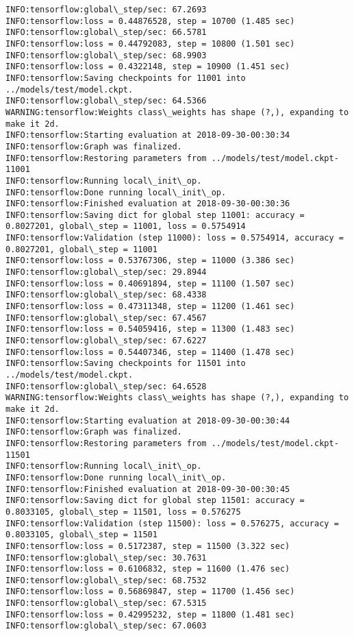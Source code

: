 \documentclass[11pt]{article}
\begin{document}
\begin{Verbatim}[commandchars=\\\{\}]
INFO:tensorflow:global\_step/sec: 67.2693
INFO:tensorflow:loss = 0.44876528, step = 10700 (1.485 sec)
INFO:tensorflow:global\_step/sec: 66.5781
INFO:tensorflow:loss = 0.44792083, step = 10800 (1.501 sec)
INFO:tensorflow:global\_step/sec: 68.9903
INFO:tensorflow:loss = 0.4322148, step = 10900 (1.451 sec)
INFO:tensorflow:Saving checkpoints for 11001 into ../models/test/model.ckpt.
INFO:tensorflow:global\_step/sec: 64.5366
WARNING:tensorflow:Weights class\_weights has shape (?,), expanding to make it 2d.
INFO:tensorflow:Starting evaluation at 2018-09-30-00:30:34
INFO:tensorflow:Graph was finalized.
INFO:tensorflow:Restoring parameters from ../models/test/model.ckpt-11001
INFO:tensorflow:Running local\_init\_op.
INFO:tensorflow:Done running local\_init\_op.
INFO:tensorflow:Finished evaluation at 2018-09-30-00:30:36
INFO:tensorflow:Saving dict for global step 11001: accuracy = 0.8027201, global\_step = 11001, loss = 0.5754914
INFO:tensorflow:Validation (step 11000): loss = 0.5754914, accuracy = 0.8027201, global\_step = 11001
INFO:tensorflow:loss = 0.53767306, step = 11000 (3.386 sec)
INFO:tensorflow:global\_step/sec: 29.8944
INFO:tensorflow:loss = 0.40691894, step = 11100 (1.507 sec)
INFO:tensorflow:global\_step/sec: 68.4338
INFO:tensorflow:loss = 0.47311348, step = 11200 (1.461 sec)
INFO:tensorflow:global\_step/sec: 67.4567
INFO:tensorflow:loss = 0.54059416, step = 11300 (1.483 sec)
INFO:tensorflow:global\_step/sec: 67.6227
INFO:tensorflow:loss = 0.54407346, step = 11400 (1.478 sec)
INFO:tensorflow:Saving checkpoints for 11501 into ../models/test/model.ckpt.
INFO:tensorflow:global\_step/sec: 64.6528
WARNING:tensorflow:Weights class\_weights has shape (?,), expanding to make it 2d.
INFO:tensorflow:Starting evaluation at 2018-09-30-00:30:44
INFO:tensorflow:Graph was finalized.
INFO:tensorflow:Restoring parameters from ../models/test/model.ckpt-11501
INFO:tensorflow:Running local\_init\_op.
INFO:tensorflow:Done running local\_init\_op.
INFO:tensorflow:Finished evaluation at 2018-09-30-00:30:45
INFO:tensorflow:Saving dict for global step 11501: accuracy = 0.8033105, global\_step = 11501, loss = 0.576275
INFO:tensorflow:Validation (step 11500): loss = 0.576275, accuracy = 0.8033105, global\_step = 11501
INFO:tensorflow:loss = 0.5172387, step = 11500 (3.322 sec)
INFO:tensorflow:global\_step/sec: 30.7631
INFO:tensorflow:loss = 0.6106832, step = 11600 (1.476 sec)
INFO:tensorflow:global\_step/sec: 68.7532
INFO:tensorflow:loss = 0.56869847, step = 11700 (1.456 sec)
INFO:tensorflow:global\_step/sec: 67.5315
INFO:tensorflow:loss = 0.42995232, step = 11800 (1.481 sec)
INFO:tensorflow:global\_step/sec: 67.0603

\end{Verbatim}
\end{document}
